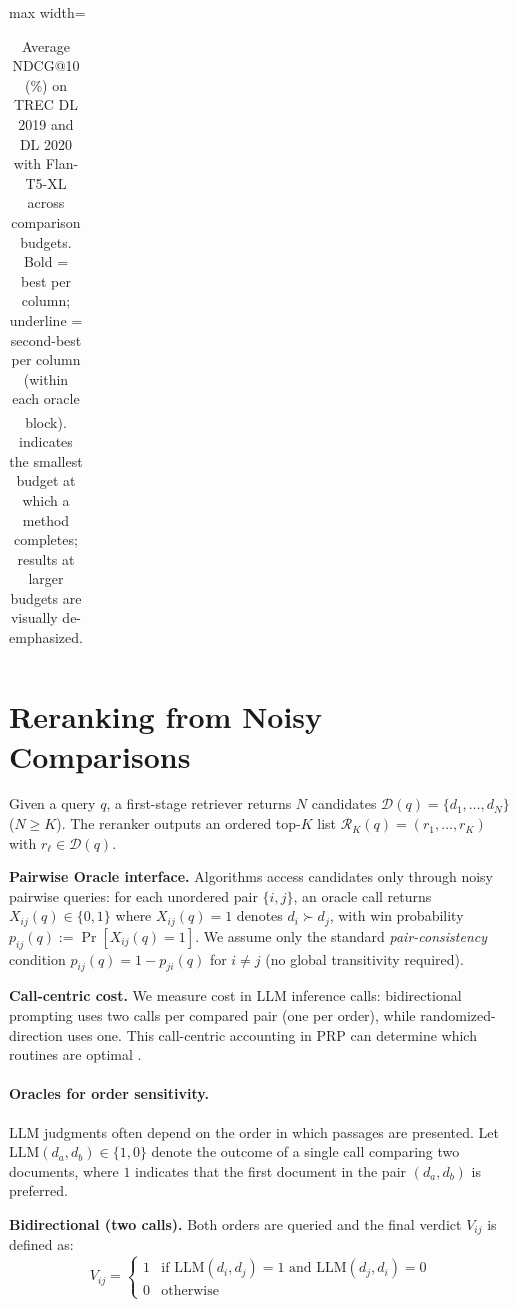 \documentclass[11pt]{article}
\begin{document}
\begin{table}[t]
\begin{adjustbox}{max width=\textwidth}
\begin{tabular}{c l rrrrrrrrr}
\bottomrule
\end{tabular}%
\end{adjustbox}
\caption{Average NDCG@10 (\%) on TREC DL 2019 and DL 2020 with Flan-T5-XL across comparison budgets. Bold = best per column; underline = second-best per column (within each oracle block). \textsuperscript{\textdagger} indicates the smallest budget at which a method completes; results at larger budgets are visually de-emphasized.}
\label{tab:budget_ndcg10_oracles_flan_xl}
\end{table}



\section{Reranking from Noisy Comparisons}
\label{sec:setup}

Given a query $q$, a first-stage retriever returns $N$ candidates
$\mathcal{D}(q)=\{d_1,\dots,d_N\}$ ($N\ge K$). The reranker outputs an ordered
top-$K$ list $\mathcal{R}_K(q)=(r_1,\dots,r_K)$ with $r_\ell \in \mathcal{D}(q)$.

\noindent\textbf{Pairwise Oracle interface.}
Algorithms access candidates only through noisy pairwise queries: for each unordered
pair $\{i,j\}$, an oracle call returns $X_{ij}(q)\in\{0,1\}$ where $X_{ij}(q)=1$
denotes $d_i \succ d_j$, with win probability $p_{ij}(q):=\Pr[X_{ij}(q)=1]$.
We assume only the standard \emph{pair-consistency} condition $p_{ij}(q)=1-p_{ji}(q)$
for $i\neq j$ (no global transitivity required).

\noindent\textbf{Call-centric cost.}
We measure cost in LLM inference calls: bidirectional prompting uses two calls per
compared pair (one per order), while randomized-direction uses one. This call-centric
accounting in PRP can determine which routines
are optimal \citep{wisznia2025batchingcaching}.

\paragraph{Oracles for order sensitivity.}
LLM judgments often depend on the order in which passages are presented. Let $\text{LLM}(d_a, d_b) \in \{1, 0\}$ denote the outcome of a single call comparing two documents, where $1$ indicates that the first document in the pair $(d_a, d_b)$ is preferred.

\noindent\textbf{Bidirectional (two calls).}
Both orders are queried and the final verdict $V_{ij}$ is defined as:
\[
V_{ij} = \begin{cases} 
1 & \text{if } \text{LLM}(d_i, d_j) = 1 \text{ and } \text{LLM}(d_j, d_i) = 0 \\
0 & \text{otherwise} 
\end{cases}
\]
\end{document}
